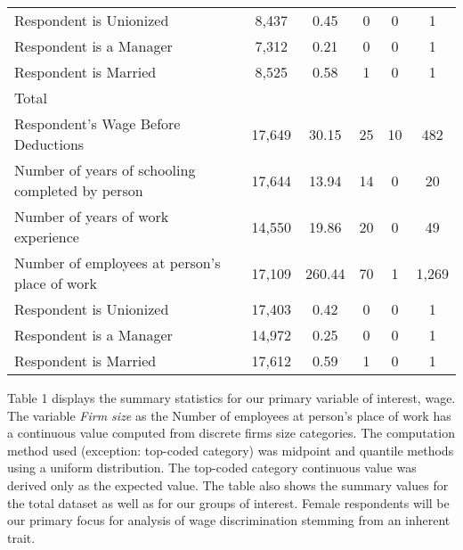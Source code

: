 \documentclass[11pt]{article}
\begin{document}
{\begin{table}[ht]
\begin{tabular}{l*{1}{ccccc}}
Respondent is Unionized&       8,437&        0.45&           0&           0&           1\\
Respondent is a Manager&       7,312&        0.21&           0&           0&           1\\
Respondent is Married&       8,525&        0.58&           1&           0&           1\\
\midrule
Total               &            &            &            &            &            \\
Respondent's Wage Before Deductions&      17,649&       30.15&          25&          10&         482\\
Number of years of schooling completed by person&      17,644&       13.94&          14&           0&          20\\
Number of years of work experience&      14,550&       19.86&          20&           0&          49\\
Number of employees at person's place of work        &      17,109&      260.44&          70&           1&       1,269\\
Respondent is Unionized&      17,403&        0.42&           0&           0&           1\\
Respondent is a Manager&      14,972&        0.25&           0&           0&           1\\
Respondent is Married&      17,612&        0.59&           1&           0&           1\\
\bottomrule
\end{tabular}
\end{table}
}

Table 1 displays the summary statistics for our primary variable of interest, wage. The variable \textit{Firm size} as the Number of employees at person's place of work has a continuous value computed from discrete firms size categories. The computation method used (exception: top-coded category) was midpoint and quantile methods using a uniform distribution. The top-coded category continuous value was derived only as the expected value. The table also shows the summary values for the total dataset as well as for our groups of interest. Female respondents will be our primary focus for analysis of wage discrimination stemming from an inherent trait.  
\end{document}
